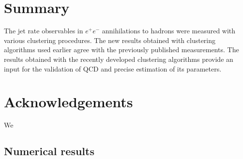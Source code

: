 \section{Summary}                      
\label{sec:summary}
The jet rate observables  in $e^+e^-$ 
annihilations to hadrons were measured with various clustering procedures.
The new results obtained with 
clustering algorithms  used earlier agree with the previously published measurements.
The results obtained with the recently developed clustering algorithms  
provide an input for the validation of QCD and precise estimation of its parameters.
%
\section*{Acknowledgements}
\label{sec:acknowledgements}
We
\FloatBarrier
\begin{appendices}
\section{Numerical results}
\label{sec:appendixA}


\end{appendices}
